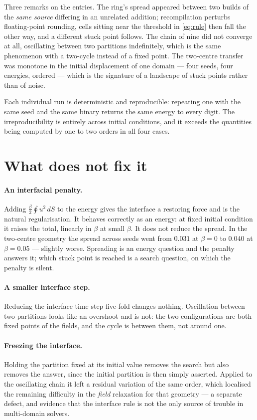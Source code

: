 \documentclass[11pt]{article}
\begin{document}
\noindent Three remarks on the entries. The ring's spread appeared between two builds of the
\emph{same source} differing in an unrelated addition; recompilation perturbs floating-point
rounding, cells sitting near the threshold in \eqref{eq:rule} then fall the other way, and a
different stuck point follows. The chain of nine did not converge at all, oscillating between two
partitions indefinitely, which is the same phenomenon with a two-cycle instead of a fixed point. The
two-centre transfer was monotone in the initial displacement of one domain --- four seeds, four
energies, ordered --- which is the signature of a landscape of stuck points rather than of noise.

Each individual run is deterministic and reproducible: repeating one with the same seed and the same
binary returns the same energy to every digit. The irreproducibility is entirely across initial
conditions, and it exceeds the quantities being computed by one to two orders in all four cases.

\section{What does not fix it}

\paragraph{An interfacial penalty.} Adding $\tfrac{\beta}{2}\oint u^2\,dS$ to the energy gives the
interface a restoring force and is the natural regularisation. It behaves correctly as an energy: at
fixed initial condition it raises the total, linearly in $\beta$ at small $\beta$. It does not
reduce the spread. In the two-centre geometry the spread across seeds went from $0.031$ at
$\beta=0$ to $0.040$ at $\beta=0.05$ --- slightly worse. Spreading is an energy question and the
penalty answers it; which stuck point is reached is a search question, on which the penalty is
silent.

\paragraph{A smaller interface step.} Reducing the interface time step five-fold changes nothing.
Oscillation between two partitions looks like an overshoot and is not: the two configurations are
both fixed points of the fields, and the cycle is between them, not around one.

\paragraph{Freezing the interface.} Holding the partition fixed at its initial value removes the
search but also removes the answer, since the initial partition is then simply asserted. Applied to
the oscillating chain it left a residual variation of the same order, which localised the remaining
difficulty in the \emph{field} relaxation for that geometry --- a separate defect, and evidence that
the interface rule is not the only source of trouble in multi-domain solvers.
\end{document}
